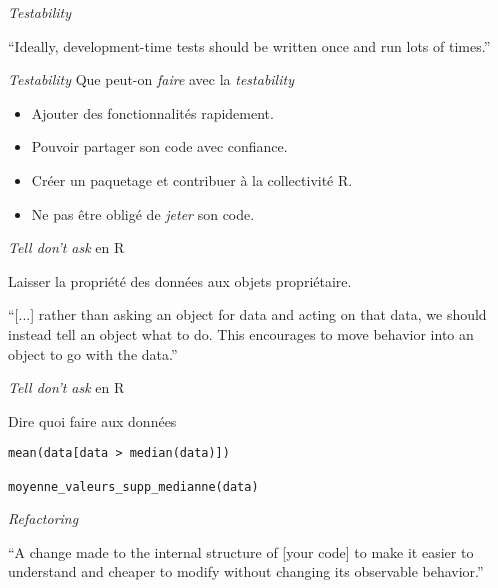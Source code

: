 \documentclass[11pt]{beamer}
\begin{document}
\begin{frame}{\textit{Testability}}
\begin{block}{}
{\large ``Ideally, development-time tests should be written once and run lots of times.''}
\vskip5mm
\hspace*{}
\end{block}
\end{frame}

\begin{frame}{\textit{Testability}}
Que peut-on \textit{faire} avec la \textit{testability}
\begin{itemize}
	\item Ajouter des fonctionnalités rapidement.
	\item Pouvoir partager son code avec confiance.
	\item Créer un paquetage et contribuer à la collectivité R.
	\item Ne pas être obligé de \textit{jeter} son code.
\end{itemize}
\end{frame}

\begin{frame}{\textit{Tell don't ask} en R}

Laisser la propriété des données aux objets propriétaire.

\begin{block}{}
{\large ``[...] rather than asking an object for data and acting on that data, we should instead tell an object what to do. This encourages to move behavior into an object to go with the data.''}
\vskip5mm
\hspace*{}
\end{block}
\end{frame}

\begin{frame}[fragile]{\textit{Tell don't ask} en R}
\begin{block}{Dire quoi faire aux données}
\begin{lstlisting}
mean(data[data > median(data)])

moyenne_valeurs_supp_medianne(data)
\end{lstlisting}
\end{block}
\end{frame}

\begin{frame}{\textit{Refactoring}}
\begin{block}{}
{\large ``A change made to the internal structure of [your code] to make it easier to understand and cheaper to modify without changing its observable behavior.''}
\vskip5mm
\hspace*{}
\end{block}
\end{frame}
\end{document}
